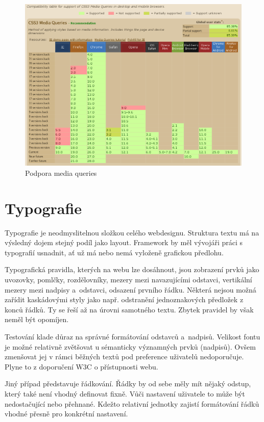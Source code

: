 \documentclass[thesis=B,czech]{FITthesis}[2012/06/26]
\begin{document}
\begin{figure}[h]
	\begin{center}
	\includegraphics[scale=0.55]{images/image20.png}
	\end{center}
	\caption{Podpora media queries}
	\label{imgMQ}
\end{figure}


\newpage
\section{Typografie}


Typografie je neodmyslitelnou složkou celého webdesignu. Struktura textu má na výsledný dojem stejný podíl jako layout. Framework by měl vývojáři práci s typografií usnadnit, ať už má nebo nemá vyloženě grafickou předlohu.

Typografická pravidla, kterých na webu lze dosáhnout, jsou zobrazení prvků jako uvozovky, pomlčky, rozdělovníky, mezery mezi navazujícími odstavci, vertikální mezery mezi nadpisy a~odstavci, odsazení prvního řádku. Některá nejsou možná zařídit kaskádovými styly jako např. odstranění jednoznakových předložek z konců řádků. Ty se řeší až na úrovni samotného textu. Zbytek pravidel by však neměl být opomíjen.

Testování klade důraz na správné formátování odstavců a~nadpisů. Velikost fontu je možné relativně zvětšovat u sémanticky významných prvků (nadpisů). Ovšem zmenšovat jej v rámci běžných textů pod
preference uživatelů nedoporučuje. Plyne to z doporučení \gls{W3C} o přístupnosti webu.\cite{wcag} 

Jiný případ představuje řádkování. Řádky by od sebe měly mít nějaký odstup, který také není vhodný definovat fixně. Vůči nastavení uživatele to může být nedostačující nebo přehnané. Kdežto relativní jednotky zajistí formátování řádků vhodné přesně pro konkrétní nastavení. 
\end{document}
